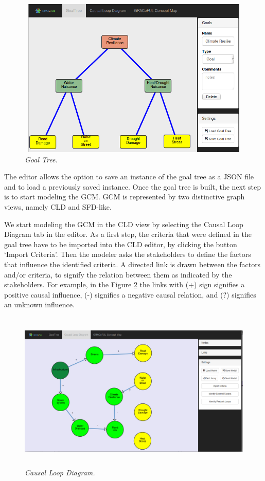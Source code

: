 \documentclass[a4paper]{article}
\begin{document}
\begin{figure}
\begin{center}
\includegraphics[height=3in,width=5in]{img/goal_tree.png}
\caption{\small \sl Goal Tree.\label{fig:goal_tree}}
\end{center}
\end{figure}

The editor allows the option to save an instance of the goal tree as a JSON file and to load a previously saved instance. Once the goal tree is built, the next step is to start modeling the GCM. GCM is represented by two distinctive graph views, namely CLD and SFD-like. 

We start modeling the GCM in the CLD view by selecting the Causal Loop Diagram tab in the editor. As a first step, the criteria that were defined in the goal tree have to be imported into the CLD editor, by clicking the button ‘Import Criteria’. Then the modeler asks the stakeholders to define the factors that influence the identified criteria. A directed link is drawn between the factors and/or criteria, to signify the relation between them as indicated by the stakeholders. For example, in the Figure \ref{fig:cld} the links with (+) sign signifies a positive causal influence, (-) signifies a negative causal relation, and (?) signifies an unknown influence. 

\begin{figure}
\begin{center}
\includegraphics[height=3in,width=5in]{img/cld.png}
\caption{\small \sl Causal Loop Diagram.\label{fig:cld}}
\end{center}
\end{figure}
\end{document}
